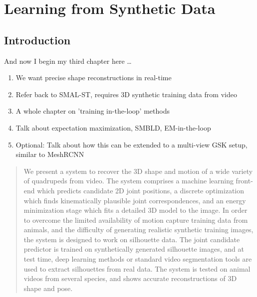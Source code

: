 \chapter{Learning from Synthetic Data}

\ifpdf
    \graphicspath{{Chapter3/Figs/Raster/}{Chapter3/Figs/PDF/}{Chapter3/Figs/}}
\else
    \graphicspath{{Chapter3/Figs/Vector/}{Chapter3/Figs/}}
\fi

\section{Introduction}
And now I begin my third chapter here \dots

\begin{enumerate}
  \item We want precise shape reconstructions in real-time
  \item Refer back to SMAL-ST, requires 3D synthetic training data from video
  \item A whole chapter on 'training in-the-loop' methods
  \item Talk about expectation maximization, SMBLD, EM-in-the-loop
  \item Optional: Talk about how this can be extended to a multi-view GSK setup, similar to MeshRCNN
\end{enumerate}

\begin{abstract}
  We present a system to recover the 3D shape and motion of a wide variety of quadrupeds from video.  The system comprises a machine learning front-end which predicts candidate 2D joint positions, a discrete optimization which finds kinematically plausible joint correspondences, 
  and an energy minimization stage which fits a detailed 3D model to the image. In order to overcome the limited availability of motion capture training data from animals, and the difficulty of generating realistic synthetic training images, the system is designed to work on silhouette data.  The joint candidate predictor is trained on synthetically generated silhouette images, and at test time, deep learning methods or standard video segmentation tools are used to extract silhouettes from real data. The system is tested on animal videos from several species, and shows accurate reconstructions of 3D shape and pose.
  \end{abstract}
